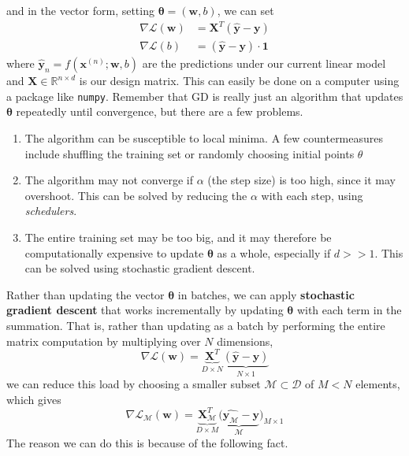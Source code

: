   and in the vector form, setting $\boldsymbol{\theta} = (\mathbf{w}, b)$, we can set 
  \begin{align}
    \nabla \mathcal{L} (\mathbf{w}) & = \mathbf{X}^T (\hat{\mathbf{y}} - \mathbf{y}) \\
    \nabla \mathcal{L} (b) & = (\hat{\mathbf{y}} - \mathbf{y}) \cdot \mathbf{1}
  \end{align}
  where $\hat{\mathbf{y}}_n = f(\mathbf{x}^{(n)}; \mathbf{w}, b)$ are the predictions under our current linear model and $\mathbf{X} \in \mathbb{R}^{n \times d}$ is our design matrix. This can easily be done on a computer using a package like \texttt{numpy}. Remember that GD is really just an algorithm that updates $\boldsymbol{\theta}$ repeatedly until convergence, but there are a few problems.
  \begin{enumerate}
    \item The algorithm can be susceptible to local minima. A few countermeasures include shuffling the training set or randomly choosing initial points $\theta$
    \item The algorithm may not converge if $\alpha$ (the step size) is too high, since it may overshoot. This can be solved by reducing the $\alpha$ with each step, using \textit{schedulers}. 
    \item The entire training set may be too big, and it may therefore be computationally expensive to update $\boldsymbol{\theta}$ as a whole, especially if $d >> 1$. This can be solved using stochastic gradient descent.
  \end{enumerate}

  Rather than updating the vector $\boldsymbol{\theta}$ in batches, we can apply \textbf{stochastic gradient descent} that works incrementally by updating $\boldsymbol{\theta}$ with each term in the summation. That is, rather than updating as a batch by performing the entire matrix computation by multiplying over $N$ dimensions,
  \begin{equation}
    \nabla \mathcal{L} (\mathbf{w}) = \underbrace{\mathbf{X}^T}_{D \times N} \underbrace{(\hat{\mathbf{y}} - \mathbf{y})}_{N \times 1}
  \end{equation}
  we can reduce this load by choosing a smaller subset $\mathcal{M} \subset \mathcal{D}$ of $M < N$ elements, which gives 
  \begin{equation}
    \nabla \mathcal{L}_{\mathcal{M}} (\mathbf{w}) = \underbrace{\mathbf{X}_{\mathcal{M}}^T}_{D \times M} \underbrace{(\hat{\mathbf{y}_{\mathcal{M}}} - \mathbf{y}}_{\mathcal{M}})_{M \times 1}
  \end{equation}
  The reason we can do this is because of the following fact.  
  
